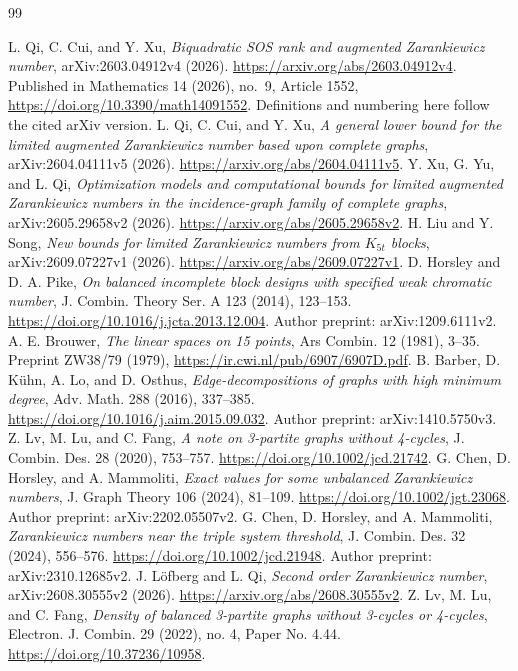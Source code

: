 \documentclass[11pt]{article}
\begin{document}
\begin{thebibliography}{99}
\small
\setlength{\itemsep}{2pt}
\raggedright
{} L. Qi, C. Cui, and Y. Xu,
\emph{Biquadratic SOS rank and augmented Zarankiewicz number},
arXiv:2603.04912v4 (2026).
\url{https://arxiv.org/abs/2603.04912v4}.
Published in Mathematics 14 (2026), no.\ 9, Article 1552,
\url{https://doi.org/10.3390/math14091552}.
Definitions and numbering here follow the cited arXiv version.
 L. Qi, C. Cui, and Y. Xu,
\emph{A general lower bound for the limited augmented Zarankiewicz number
based upon complete graphs}, arXiv:2604.04111v5 (2026).
\url{https://arxiv.org/abs/2604.04111v5}.
 Y. Xu, G. Yu, and L. Qi,
\emph{Optimization models and computational bounds for limited augmented
Zarankiewicz numbers in the incidence-graph family of complete graphs},
arXiv:2605.29658v2 (2026).
\url{https://arxiv.org/abs/2605.29658v2}.
 H. Liu and Y. Song,
\emph{New bounds for limited Zarankiewicz numbers from $K_{5t}$ blocks},
arXiv:2609.07227v1 (2026).
\url{https://arxiv.org/abs/2609.07227v1}.
 D. Horsley and D. A. Pike,
\emph{On balanced incomplete block designs with specified weak chromatic number},
J. Combin. Theory Ser. A 123 (2014), 123--153.
\url{https://doi.org/10.1016/j.jcta.2013.12.004}.
Author preprint: arXiv:1209.6111v2.
 A. E. Brouwer,
\emph{The linear spaces on 15 points}, Ars Combin. 12 (1981), 3--35.
Preprint ZW38/79 (1979), \url{https://ir.cwi.nl/pub/6907/6907D.pdf}.
 B. Barber, D. K\"uhn, A. Lo, and D. Osthus,
\emph{Edge-decompositions of graphs with high minimum degree},
Adv. Math. 288 (2016), 337--385.
\url{https://doi.org/10.1016/j.aim.2015.09.032}.
Author preprint: arXiv:1410.5750v3.
 Z. Lv, M. Lu, and C. Fang,
\emph{A note on 3-partite graphs without 4-cycles},
J. Combin. Des. 28 (2020), 753--757.
\url{https://doi.org/10.1002/jcd.21742}.
 G. Chen, D. Horsley, and A. Mammoliti,
\emph{Exact values for some unbalanced Zarankiewicz numbers},
J. Graph Theory 106 (2024), 81--109.
\url{https://doi.org/10.1002/jgt.23068}.
Author preprint: arXiv:2202.05507v2.
 G. Chen, D. Horsley, and A. Mammoliti,
\emph{Zarankiewicz numbers near the triple system threshold},
J. Combin. Des. 32 (2024), 556--576.
\url{https://doi.org/10.1002/jcd.21948}.
Author preprint: arXiv:2310.12685v2.
 J. L\"ofberg and L. Qi,
\emph{Second order Zarankiewicz number}, arXiv:2608.30555v2 (2026).
\url{https://arxiv.org/abs/2608.30555v2}.
 Z. Lv, M. Lu, and C. Fang,
\emph{Density of balanced 3-partite graphs without 3-cycles or 4-cycles},
Electron. J. Combin. 29 (2022), no. 4, Paper No. 4.44.
\url{https://doi.org/10.37236/10958}.
\end{thebibliography}
\end{document}
